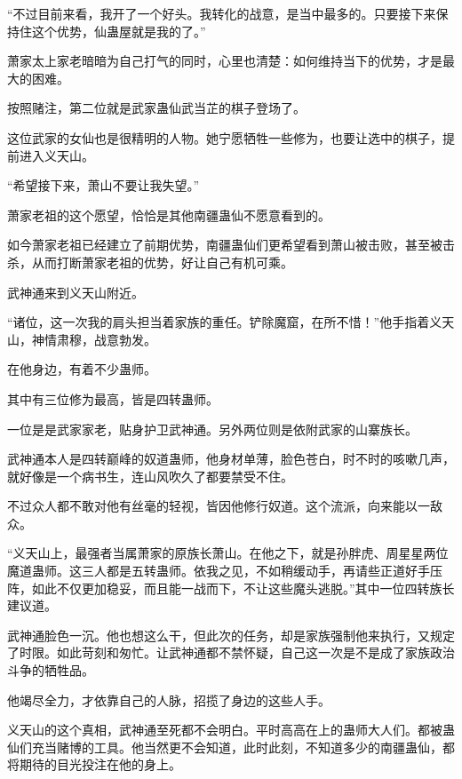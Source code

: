 
\begin{this_body}



“不过目前来看，我开了一个好头。我转化的战意，是当中最多的。只要接下来保持住这个优势，仙蛊屋就是我的了。”

萧家太上家老暗暗为自己打气的同时，心里也清楚：如何维持当下的优势，才是最大的困难。

按照赌注，第二位就是武家蛊仙武当芷的棋子登场了。

这位武家的女仙也是很精明的人物。她宁愿牺牲一些修为，也要让选中的棋子，提前进入义天山。

“希望接下来，萧山不要让我失望。”

萧家老祖的这个愿望，恰恰是其他南疆蛊仙不愿意看到的。

如今萧家老祖已经建立了前期优势，南疆蛊仙们更希望看到萧山被击败，甚至被击杀，从而打断萧家老祖的优势，好让自己有机可乘。

武神通来到义天山附近。

“诸位，这一次我的肩头担当着家族的重任。铲除魔窟，在所不惜！”他手指着义天山，神情肃穆，战意勃发。

在他身边，有着不少蛊师。

其中有三位修为最高，皆是四转蛊师。

一位是是武家家老，贴身护卫武神通。另外两位则是依附武家的山寨族长。

武神通本人是四转巅峰的奴道蛊师，他身材单薄，脸色苍白，时不时的咳嗽几声，就好像是一个病书生，连山风吹久了都要禁受不住。

不过众人都不敢对他有丝毫的轻视，皆因他修行奴道。这个流派，向来能以一敌众。

“义天山上，最强者当属萧家的原族长萧山。在他之下，就是孙胖虎、周星星两位魔道蛊师。这三人都是五转蛊师。依我之见，不如稍缓动手，再请些正道好手压阵，如此不仅更加稳妥，而且能一战而下，不让这些魔头逃脱。”其中一位四转族长建议道。

武神通脸色一沉。他也想这么干，但此次的任务，却是家族强制他来执行，又规定了时限。如此苛刻和匆忙。让武神通都不禁怀疑，自己这一次是不是成了家族政治斗争的牺牲品。

他竭尽全力，才依靠自己的人脉，招揽了身边的这些人手。

义天山的这个真相，武神通至死都不会明白。平时高高在上的蛊师大人们。都被蛊仙们充当赌博的工具。他当然更不会知道，此时此刻，不知道多少的南疆蛊仙，都将期待的目光投注在他的身上。


\end{this_body}
